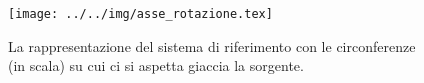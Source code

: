 \begin{figure}[h]\centering\texttt{[image: ../../img/asse\_rotazione.tex]}\caption{La rappresentazione del sistema di riferimento con le circonferenze (in scala) su cui ci si aspetta giaccia la sorgente. }\label{fig:asse_rotazione}\end{figure}
